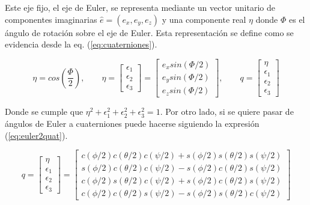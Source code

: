 Este eje fijo, el eje de Euler, se representa mediante un vector unitario de componentes imaginarias $\hat{e} =(e_x,e_y,e_z)$ y una componente real $\eta$ donde $\Phi$ es el  ángulo de rotación sobre el eje de Euler. Esta representación se define como se evidencia desde la eq. (\ref{eq:cuaterniones}).

\begin{equation}
	\eta = cos\left(\frac{\Phi}{2}\right),
	\qquad
	\eta =\left[\begin{array}{c}
		\epsilon_1\\
		\epsilon_2\\
		 \epsilon_3
	\end{array}\right] =
	\left[\begin{array}{c}
		e_x sin\left(\Phi/2\right)\\
		e_y sin\left(\Phi/2\right)\\
		e_z sin\left(\Phi/2\right)
	\end{array}\right] ,
	\qquad
		q = \left[\begin{array}{c}
			\eta\\
		\epsilon_1\\
		\epsilon_2\\
		\epsilon_3
	\end{array}\right] 
	\label{eq:cuaterniones}
\end{equation}


Donde se cumple que $\eta^2 + \epsilon_1^2+ \epsilon_2^2+ \epsilon_3^2 =1 $. Por otro lado, si se quiere pasar de ángulos de Euler a cuaterniones puede hacerse siguiendo la expresión (\ref{eq:euler2quat}).

\begin{equation}
q=\left[\begin{array}{c}
	\eta \\
	\epsilon_1 \\
	\epsilon_2 \\
	\epsilon_3
\end{array}\right]=\left[\begin{array}{l}
	c(\phi / 2) c(\theta / 2) c(\psi / 2)+s(\phi / 2) s(\theta / 2) s(\psi / 2) \\
	s(\phi / 2) c(\theta / 2) c(\psi / 2)-s(\phi / 2) c(\theta / 2) s(\psi / 2) \\
	c(\phi / 2) s(\theta / 2) c(\psi / 2)+s(\phi / 2) c(\theta / 2) s(\psi / 2) \\
	c(\phi / 2) c(\theta / 2) s(\psi / 2)-s(\phi / 2) s(\theta / 2) c(\psi / 2)
\end{array}\right]\label{eq:euler2quat}
\end{equation}


